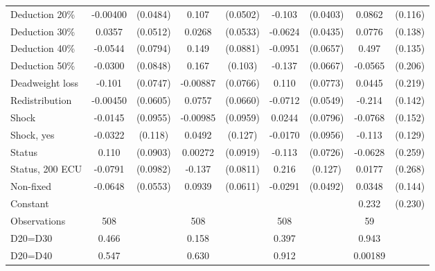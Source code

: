 \begin{tabular}{l|cccccc|cc}
Deduction 20\%& -0.00400         & (0.0484)&    0.107\sym{**} & (0.0502)&   -0.103\sym{**} & (0.0403)&   0.0862         &  (0.116)\\
Deduction 30\%&   0.0357         & (0.0512)&   0.0268         & (0.0533)&  -0.0624         & (0.0435)&   0.0776         &  (0.138)\\
Deduction 40\%&  -0.0544         & (0.0794)&    0.149\sym{*}  & (0.0881)&  -0.0951         & (0.0657)&    0.497\sym{***}&  (0.135)\\
Deduction 50\%&  -0.0300         & (0.0848)&    0.167         &  (0.103)&   -0.137\sym{**} & (0.0667)&  -0.0565         &  (0.206)\\
Deadweight loss&   -0.101         & (0.0747)& -0.00887         & (0.0766)&    0.110         & (0.0773)&   0.0445         &  (0.219)\\
Redistribution& -0.00450         & (0.0605)&   0.0757         & (0.0660)&  -0.0712         & (0.0549)&   -0.214         &  (0.142)\\
Shock         &  -0.0145         & (0.0955)& -0.00985         & (0.0959)&   0.0244         & (0.0796)&  -0.0768         &  (0.152)\\
Shock, yes    &  -0.0322         &  (0.118)&   0.0492         &  (0.127)&  -0.0170         & (0.0956)&   -0.113         &  (0.129)\\
Status        &    0.110         & (0.0903)&  0.00272         & (0.0919)&   -0.113         & (0.0726)&  -0.0628         &  (0.259)\\
Status, 200 ECU&  -0.0791         & (0.0982)&   -0.137\sym{*}  & (0.0811)&    0.216\sym{*}  &  (0.127)&   0.0177         &  (0.268)\\
Non-fixed     &  -0.0648         & (0.0553)&   0.0939         & (0.0611)&  -0.0291         & (0.0492)&   0.0348         &  (0.144)\\
Constant        &                  &         &                  &         &                  &         &    0.232         &  (0.230)\\
\hline
Observations    &      508         &         &      508         &         &      508         &         &       59         &         \\
D20=D30         &    0.466         &         &    0.158         &         &    0.397         &         &    0.943         &         \\
D20=D40         &    0.547         &         &    0.630         &         &    0.912         &         &  0.00189         &         \\

\end{tabular}
